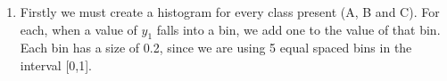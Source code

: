 \documentclass[12pt]{article}
\begin{document}
\begin{enumerate}
    \item Firstly we must create a histogram for every class present (A, B and C). For each, when a value of $y_1$ falls into a bin, we add one to the value of that bin. Each bin has a size of 0.2, since we are using 5 equal spaced bins in the interval [0,1].

\vspace{0.2cm}

    \begin{figure}[ht]
    \centering

    \begin{minipage}[t]{0.48\linewidth}
        \centering
    \end{minipage}
    \hfill
    \begin{minipage}[t]{0.48\linewidth}
        \centering
    \end{minipage}
    

\end{figure}
\end{enumerate}
\end{document}

